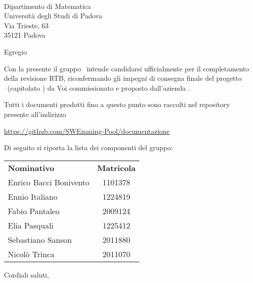 \documentclass[12pt, boldsubject, italicsignature, noindent]{letteracdp}
\date{}
\begin{document}
\begin{letter}{
        \Vardanega \\
        Dipartimento di Matematica \\
        Università degli Studi di Padova \\
        Via Trieste, 63 \\ 35121 Padova
    }

    \opening{Egregio \vardanega}

    Con la presente il gruppo \groupName\ intende candidarsi ufficialmente per il completamento della revisione RTB, riconfermando gli impegni di consegna finale del progetto \capName\ (capitolato \capCode) da Voi commissionato e proposto dall'azienda \capProposer.

    Tutti i documenti prodotti fino a questo punto sono raccolti nel repository presente all'indirizzo
    \begin{center}
        \url{https://github.com/SWEmming-Pool/documentazione}
    \end{center}

    Di seguito si riporta la lista dei componenti del gruppo:

    \begin{center}
        \begin{tabular}{l|c}
            \textbf{Nominativo}    & \textbf{Matricola} \\
            Enrico Bacci Bonivento & 1101378            \\
            Ennio Italiano         & 1224819            \\
            Fabio Pantaleo         & 2009124            \\
            Elia Pasquali          & 1225412            \\
            Sebastiano Sanson      & 2011880            \\
            Nicolò Trinca          & 2011070
        \end{tabular}
    \end{center}

    \closing{Cordiali saluti,}

\end{letter}
\end{document}
